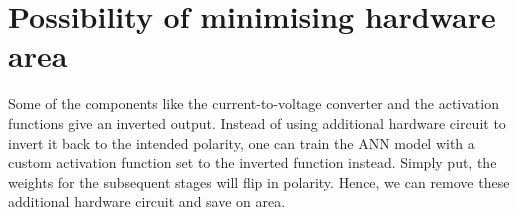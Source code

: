 \section{Possibility of minimising hardware area}

Some of the components like the current-to-voltage converter and the activation functions give an inverted output.
Instead of using additional hardware circuit to invert it back to the intended polarity, one can train the \ac{ANN} model with a custom activation function set to the inverted function instead.
Simply put, the weights for the subsequent stages will flip in polarity. Hence, we can remove these additional hardware circuit and save on area.
